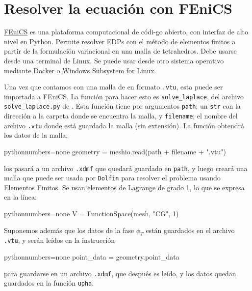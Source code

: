 \newpage

\section{Resolver la ecuación con FEniCS}

\href{https://fenicsproject.org}{FEniCS} es una plataforma computacional de códi-go abierto, con interfaz de alto nivel en Python. Permite resolver EDPs con el método de elementos finitos a partir de la formulación variacional en una malla de tetrahedros. Debe usarse desde una terminal de Linux. Se puede usar desde otro sistema operativo mediante \href{https://www.docker.com}{Docker} o \href{https://docs.microsoft.com/en-us/windows/wsl/install-win10}{Windows Subsystem for Linux}.

Una vez que contamos con una malla de en formato \texttt{.vtu}, esta puede ser importada a FEniCS. La función para hacer esto es \texttt{solve\_laplace}, del archivo \texttt{solve\_laplace.py} de \cite{github}. Esta función tiene por argumentos \texttt{path}; un \texttt{str} con la dirección a la carpeta donde se encuentra la malla, y \texttt{filename}; el nombre del archivo \texttt{.vtu} donde está guardada la malla (sin extensión). La función obtendrá los datos de la malla, 

\begin{sourcecodep}{python}{numbers=none}{}
geometry = meshio.read(path + filename + ".vtu")
\end{sourcecodep}

los pasará a un archivo \texttt{.xdmf} que quedará guardado en \texttt{path}, y luego creará una malla que puede ser usada por \texttt{Dolfin} para resolver el problema usando Elementos Finitos. Se usan elementos de Lagrange de grado 1, lo que se expresa en la línea:
\begin{sourcecodep}{python}{numbers=none}{}
V = FunctionSpace(mesh, "CG", 1) 
\end{sourcecodep}
Suponemos además que los datos de la fase $\phi_T$ están guardados en el archivo \texttt{.vtu}, y serán leídos en la instrucción

\begin{sourcecodep}{python}{numbers=none}{}
point_data = geometry.point_data
\end{sourcecodep}

para guardarse en un archivo \texttt{.xdmf}, que después es leído, y los datos quedan guardados en la función  \texttt{upha}.

